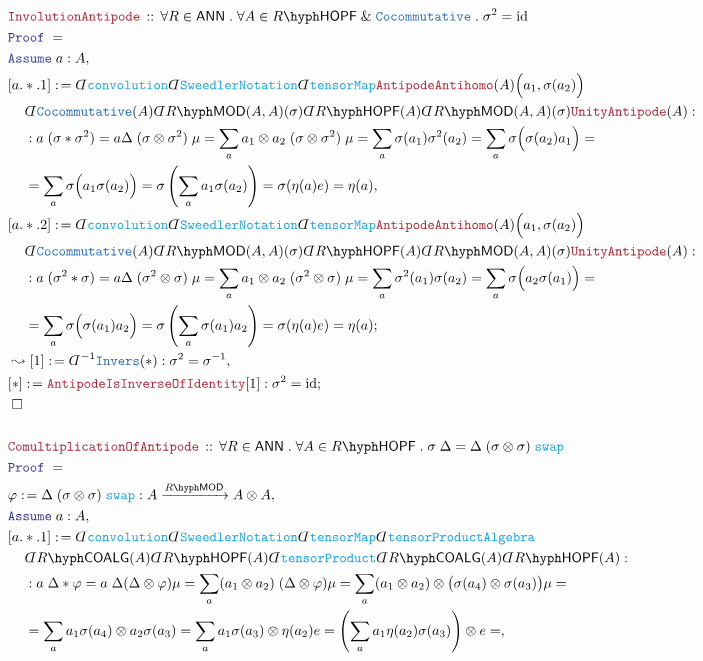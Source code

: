 \documentclass[12pt]{scrartcl}%
\newcommand{\TYPE}[1]{\textcolor{NavyBlue}{\mathtt{#1}}}%
\newcommand{\FUNC}[1]{\textcolor{Cerulean}{\mathtt{#1}}}%
\newcommand{\LOGIC}[1]{\textcolor{Blue}{\mathtt{#1}}}%
\newcommand{\THM}[1]{\textcolor{Maroon}{\mathtt{#1}}}%
\renewcommand{\.}{\; . \;} %
\newcommand{\de}{: \kern 0.1pc =} %
\newcommand{\Theorem}[2]{& \THM{#1} \, :: \, #2 \\ & \Proof = \\ } %
\newcommand{\NewLine}{\\ & \kern 1pc}%
\newcommand{\Page}[1]{ \begin{align*} #1 \end{align*}  }%
\newcommand{ \bd }{ \ByDef }%
\renewcommand{\And}{\; \& \;}%
\DeclareMathOperator*{\id}{id}%
\newcommand{\Say}[3]{& #1 \de #2 : #3, \\} %
\newcommand{\Conclude}[3]{& #1 \de #2 : #3; \\}%
\newcommand{\Derive}[3]{& \leadsto #1 \de #2 : #3, \\} %
\newcommand{\Assume}[2]{& \LOGIC{Assume} \; #1 : #2, \\} %
\newcommand{\QED}{\; \square} %
\newcommand{\EndProof}{& \QED \\} %
\newcommand{\ByDef}{\rotatebox[origin=c]{-180}{$D$}}%
\newcommand{\Proof}{\LOGIC{Proof} \; } %
\newcommand{\Arrow}[1]{\xrightarrow{#1}}%
\newcommand{\LMOD}[1]{#1\hyph\mathsf{MOD}} %
\newcommand{\ANN}{\mathsf{ANN}} %
\newcommand{\COALG}[1]{#1\hyph\mathsf{COALG}}%
\newcommand{\HOPF}[1]{#1\hyph\mathsf{HOPF}}%
\begin{document}
\Page{
	\Theorem{InvolutionAntipode}
	{
		\forall R \in \ANN \.
		\forall A \in \HOPF{R} \And \TYPE{Cocommutative} \.
		\sigma^2 = \id
	}
	\Assume{a}{A}
	\Say{[a.*.1]}
	{
		\bd \FUNC{convolution}
		\bd \FUNC{SweedlerNotation}
		\bd \FUNC{tensorMap}
		\THM{AntipodeAntihomo}(A)\Big(a_1,\sigma(a_2)\Big)
		\NewLine
		\bd \TYPE{Cocommutative}(A)
		\bd \LMOD{R}(A,A)(\sigma)
		\bd \HOPF{R}(A)
		\bd \LMOD{R}(A,A)(\sigma)
		\THM{UnityAntipode}(A)
	}
	{
		\NewLine :  
		a \; (\sigma * \sigma^2) =
		a \Delta \; (\sigma \otimes \sigma^2) \; \mu =
		\sum_{a} a_1 \otimes a_2 \; (\sigma \otimes \sigma^2) \; \mu =
		\sum_{a} \sigma(a_1)\sigma^2(a_2) =
		\sum_{a} \sigma\Big(\sigma(a_2)a_1\Big) = \NewLine = 
		\sum_{a} \sigma\Big( a_1 \sigma(a_2)\Big) =
		\sigma\left( \sum_{a} a_1 \sigma(a_2) \right) =
		\sigma( \eta(a) e ) =
		\eta(a)
	}
	\Conclude{[a.*.2]}
	{
		\bd \FUNC{convolution}
		\bd \FUNC{SweedlerNotation}
		\bd \FUNC{tensorMap}
		\THM{AntipodeAntihomo}(A)\Big(a_1,\sigma(a_2)\Big)
		\NewLine
		\bd \TYPE{Cocommutative}(A)
		\bd \LMOD{R}(A,A)(\sigma)
		\bd \HOPF{R}(A)
		\bd \LMOD{R}(A,A)(\sigma)
		\THM{UnityAntipode}(A)
	}
	{
		\NewLine :  
		a \; (\sigma^2 * \sigma) =
		a \Delta \; (\sigma^2 \otimes \sigma) \; \mu =
		\sum_{a} a_1 \otimes a_2 \; (\sigma^2 \otimes \sigma) \; \mu =
		\sum_{a} \sigma^2(a_1)\sigma(a_2) =
		\sum_{a} \sigma\Big(a_2\sigma(a_1)\Big) = \NewLine = 
		\sum_{a} \sigma\Big( \sigma(a_1)a_2\Big) =
		\sigma\left( \sum_{a} \sigma(a_1)a_2 \right) =
		\sigma( \eta(a) e ) =
		\eta(a)
	}
	\Derive{[1]}{\bd^{-1}\TYPE{Invers}(*)}{\sigma^2 = \sigma^{-1}}
	\Conclude{[*]}{\THM{AntipodeIsInverseOfIdentity}[1]}
	{
		\sigma^2 = \id
	}
	\EndProof
	\\
	\Theorem{ComultiplicationOfAntipode}
	{
		\forall R \in \ANN \.
		\forall A \in \HOPF{R} \.
		\sigma \; \Delta  =  \Delta \; (\sigma \otimes \sigma) \;  \FUNC{swap}
	}
	\Say{\varphi}{\Delta \; (\sigma \otimes \sigma) \; \FUNC{swap} }
	{ A \Arrow{\LMOD{R}} A \otimes A }
	\Assume{a}{A}
	\Say{[a.*.1]}
	{
		\bd \FUNC{convolution}
		\bd \FUNC{SweedlerNotation}
		\bd \FUNC{tensorMap}
		\bd \FUNC{tensorProductAlgebra}
		\NewLine
		\bd \COALG{R}(A) \bd \HOPF{R}(A)
		\bd \FUNC{tensorProduct}
		\bd \COALG{R}(A)
		\bd \HOPF{R}(A)
	}
	{
		\NewLine : 
		a \; \Delta * \varphi =
		a \; \Delta (\Delta \otimes \varphi) \mu =
		\sum_a (a_1 \otimes a_2) \; (\Delta \otimes \varphi) \mu =
		\sum_a  (a_1 \otimes a_2) \otimes \big(\sigma(a_4) \otimes \sigma(a_3)\big) \mu  = \NewLine = 
		\sum_a  a_1 \sigma(a_4) \otimes a_2 \sigma(a_3) =
		\sum_a  a_1 \sigma(a_3) \otimes \eta(a_2) e =
		\left( \sum_a  a_1 \eta(a_2)\sigma(a_3) \right) \otimes e =
}}
\end{document}
